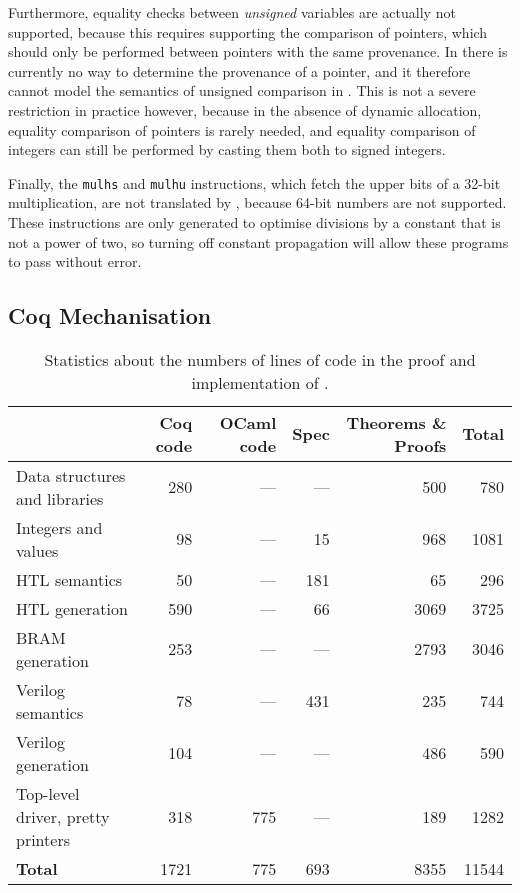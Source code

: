 Furthermore, equality checks between \emph{unsigned} variables are actually not supported, because this requires supporting the comparison of pointers, which should only be performed between pointers with the same provenance.  In \vericert{} there is currently no way to determine the provenance of a pointer, and it therefore cannot model the semantics of unsigned comparison in \compcert{}. This is not a severe restriction in practice however, because in the absence of dynamic allocation, equality comparison of pointers is rarely needed, and equality comparison of integers can still be performed by casting them both to signed integers.

Finally, the \texttt{mulhs} and \texttt{mulhu} instructions, which fetch the
upper bits of a 32-bit multiplication, are not translated by \vericert{},
because 64-bit numbers are not supported. These instructions are only generated
to optimise divisions by a constant that is not a power of two, so turning off
constant propagation will allow these programs to pass without error.

\subsection{Coq Mechanisation}

\begin{table}
  \centering
  \caption{Statistics about the numbers of lines of code in the proof and implementation of \vericert{}.}\label{tab:proof_statistics}
  \begin{tabular}{lrrrrr}
    \toprule
    & \textbf{Coq code} & \multicolumn{1}{p{1cm}}{\raggedleft\textbf{OCaml code}} & \textbf{Spec} & \multicolumn{1}{p{2cm}}{\raggedleft\textbf{Theorems \& Proofs}} & \textbf{Total}\\
    \midrule
    {Data structures and libraries}     & 280  & --- & ---  & 500  & 780   \\
    {Integers and values}               & 98   & --- & 15   & 968  & 1081  \\
    {HTL semantics}                     & 50   & --- & 181  & 65   & 296   \\
    {HTL generation}                    & 590  & --- & 66   & 3069 & 3725  \\
    {\gls{BRAM} generation}                    & 253  & --- & ---  & 2793 & 3046  \\
    {Verilog semantics}                 & 78   & --- & 431  & 235  & 744   \\
    {Verilog generation}                & 104  & --- & ---  & 486  & 590   \\
    {Top-level driver, pretty printers} & 318  & 775 & ---  & 189  & 1282  \\
    \midrule
    \textbf{Total}                      & 1721 & 775 & 693  & 8355 & 11544 \\
    \bottomrule
  \end{tabular}
\end{table}

